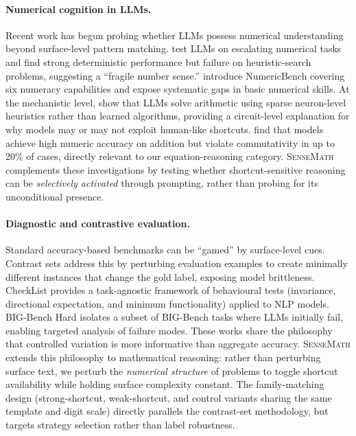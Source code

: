 \paragraph{Numerical cognition in LLMs.}
Recent work has begun probing whether LLMs possess numerical understanding beyond surface-level pattern matching.
\citet{rahman2025fragile} test LLMs on escalating numerical tasks and find strong deterministic performance but failure on heuristic-search problems, suggesting a ``fragile number sense.''
\citet{li2025numeracy} introduce NumericBench covering six numeracy capabilities and expose systematic gaps in basic numerical skills.
At the mechanistic level, \citet{nikankin2024arithmetic} show that LLMs solve arithmetic using sparse neuron-level heuristics rather than learned algorithms, providing a circuit-level explanation for why models may or may not exploit human-like shortcuts.
\citet{yan2025grasp} find that models achieve high numeric accuracy on addition but violate commutativity in up to 20\% of cases, directly relevant to our equation-reasoning category.
\textsc{SenseMath} complements these investigations by testing whether shortcut-sensitive reasoning can be \emph{selectively activated} through prompting, rather than probing for its unconditional presence.

\paragraph{Diagnostic and contrastive evaluation.}
Standard accuracy-based benchmarks can be ``gamed'' by surface-level cues.
Contrast sets \citep{gardner2020evaluating} address this by perturbing evaluation examples to create minimally different instances that change the gold label, exposing model brittleness.
CheckList \citep{ribeiro2020beyond} provides a task-agnostic framework of behavioural tests (invariance, directional expectation, and minimum functionality) applied to NLP models.
BIG-Bench Hard \citep{suzgun2023challenging} isolates a subset of BIG-Bench tasks where LLMs initially fail, enabling targeted analysis of failure modes.
These works share the philosophy that controlled variation is more informative than aggregate accuracy.
\textsc{SenseMath} extends this philosophy to mathematical reasoning: rather than perturbing surface text, we perturb the \emph{numerical structure} of problems to toggle shortcut availability while holding surface complexity constant.
The family-matching design (strong-shortcut, weak-shortcut, and control variants sharing the same template and digit scale) directly parallels the contrast-set methodology, but targets strategy selection rather than label robustness.

